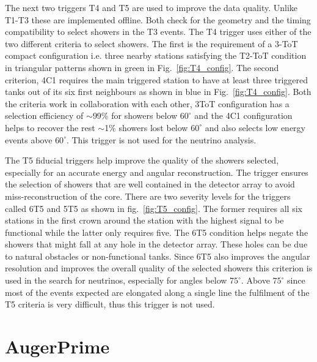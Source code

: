 The next two triggers T4 and T5 are used to improve the data quality. Unlike T1-T3 these are implemented offline. Both check for the geometry and the timing compatibility to select showers in the T3 events. The T4 trigger uses either of the two different criteria to select showers. The first is the requirement of a 3-ToT compact configuration i.e. three nearby stations satisfying the T2-ToT condition in triangular patterns shown in green in Fig.~\ref{fig:T4_config}. The second criterion, 4C1 requires the main triggered station to have at least three triggered tanks out of its six first neighbours as shown in blue in Fig.~\ref{fig:T4_config}. Both the criteria work in collaboration with each other, 3ToT configuration has a selection efficiency of $\sim$99\% for showers below $60^{\circ}$ and the 4C1 configuration helps to recover the rest $\sim$1\% showers lost below $60^{\circ}$ and also selects low energy events above $60^{\circ}$. This trigger is not used for the neutrino analysis.

The T5 fiducial triggers help improve the quality of the showers selected, especially for an accurate energy and angular reconstruction. The trigger ensures the selection of showers that are well contained in the detector array to avoid miss-reconstruction of the core. There are two severity levels for the triggers called 6T5 and 5T5 as shown in fig.~\ref{fig:T5_config}. The former requires all six stations in the first crown around the station with the highest signal to be functional while the latter only requires five. The 6T5 condition helps negate the showers that might fall at any hole in the detector array. These holes can be due to natural obstacles or non-functional tanks. Since 6T5 also improves the angular resolution and improves the overall quality of the selected showers this criterion is used in the search for neutrinos, especially for angles below $75^{\circ}$. Above $75^{\circ}$ since most of the events expected are elongated along a single line the fulfilment of the T5 criteria is very difficult, thus this trigger is not used. 

\section{AugerPrime}
\label{sec:Aug_prime}

